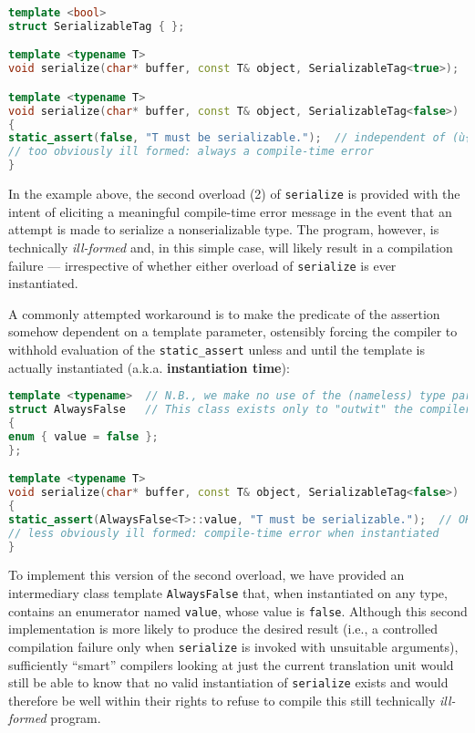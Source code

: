 \begin{lstlisting}[language=C++]
template <bool>
struct SerializableTag { };

template <typename T>
void serialize(char* buffer, const T& object, SerializableTag<true>);  // (1)

template <typename T>
void serialize(char* buffer, const T& object, SerializableTag<false>)  // (2)
{
static_assert(false, "T must be serializable.");  // independent of (ù{\codeincomments{T}}ù)
// too obviously ill formed: always a compile-time error
}
\end{lstlisting}

\noindent In the example above, the second overload (2) of \texttt{serialize} is
provided with the intent of eliciting a meaningful compile-time error
message in the event that an attempt is made to serialize a
nonserializable type. The program, however, is technically
\emph{ill-formed} and, in this simple case, will likely result in a
compilation failure --- irrespective of whether either overload of
\texttt{serialize} is ever instantiated.

A commonly attempted workaround
is to make the predicate of the assertion somehow dependent on a
template parameter, ostensibly forcing the compiler to withhold
evaluation of the \texttt{static\_assert} unless and until the template
is actually instantiated (a.k.a. \textbf{instantiation time}):

\begin{lstlisting}[language=C++]
template <typename>  // N.B., we make no use of the (nameless) type parameter:
struct AlwaysFalse   // This class exists only to "outwit" the compiler.
{
enum { value = false };
};

template <typename T>
void serialize(char* buffer, const T& object, SerializableTag<false>)  // (2)
{
static_assert(AlwaysFalse<T>::value, "T must be serializable.");  // OK
// less obviously ill formed: compile-time error when instantiated
}
\end{lstlisting}

\noindent To implement this version of the second overload, we have provided an
intermediary class template \texttt{AlwaysFalse} that, when instantiated
on any type, contains an enumerator named \texttt{value}, whose value is
\texttt{false}. Although this second implementation is more likely to
produce the desired result (i.e., a controlled compilation failure
only when \texttt{serialize} is invoked with unsuitable arguments),
sufficiently ``smart'' compilers looking at just the current translation
unit would still be able to know that no valid instantiation of
\texttt{serialize} exists and would therefore be well within their
rights to refuse to compile this still technically \emph{ill-formed}
program.

